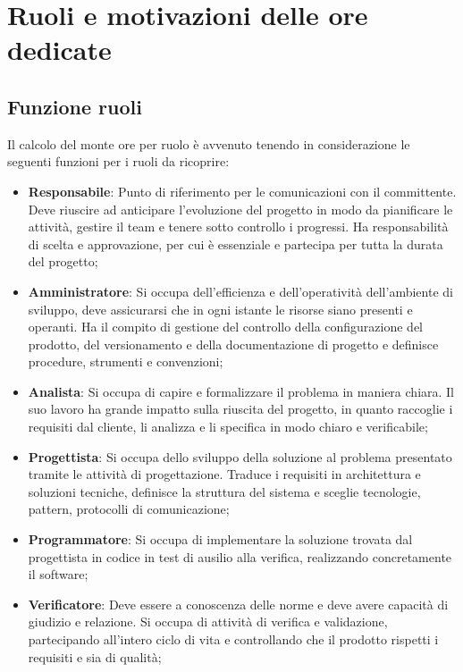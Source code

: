 \documentclass[a4paper,12pt]{article}
\begin{document}
\section{Ruoli e motivazioni delle ore dedicate}{
    \subsection{Funzione ruoli}{
        Il calcolo del monte ore per ruolo è avvenuto tenendo in considerazione le seguenti funzioni per i ruoli da ricoprire:
        
        \begin{itemize}
            \item \textbf{Responsabile}: Punto di riferimento per le comunicazioni con il committente. Deve riuscire ad anticipare l'evoluzione del progetto in modo da pianificare le attività, gestire il team e tenere sotto controllo i progressi. Ha responsabilità di scelta e approvazione, per cui è essenziale e partecipa per tutta la durata del progetto;
            \item \textbf{Amministratore}: Si occupa dell'efficienza e dell'operatività dell'ambiente di sviluppo, deve assicurarsi che in ogni istante le risorse siano presenti e operanti. Ha il compito di gestione del controllo della configurazione del prodotto, del versionamento e della documentazione di progetto e definisce procedure, strumenti e convenzioni;
            \item \textbf{Analista}: Si occupa di capire e formalizzare il problema in maniera chiara. Il suo lavoro ha grande impatto sulla riuscita del progetto, in quanto raccoglie i requisiti dal cliente, li analizza e li specifica in modo chiaro e verificabile;
            \item \textbf{Progettista}: Si occupa dello sviluppo della soluzione al problema presentato tramite le attività di progettazione. Traduce i requisiti in architettura e soluzioni tecniche, definisce la struttura del sistema e sceglie tecnologie, pattern, protocolli di comunicazione;
            \item \textbf{Programmatore}: Si occupa di implementare la soluzione trovata dal progettista in codice in test di ausilio alla verifica, realizzando concretamente il software;
            \item \textbf{Verificatore}: Deve essere a conoscenza delle norme e deve avere capacità di giudizio e relazione. Si occupa di attività di verifica e validazione, partecipando all'intero ciclo di vita e controllando che il prodotto rispetti i requisiti e sia di qualità;
        \end{itemize}
    }
    
}
\end{document}
